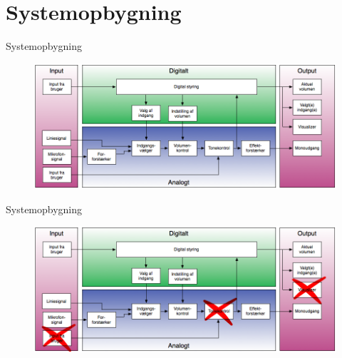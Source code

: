 \section{Systemopbygning}
\begin{frame}{Systemopbygning}

\begin{figure}[h]
\centering
\includegraphics[width=\textwidth]{images/forstaerker_opbygning.png}
\end{figure}

\end{frame}

\begin{frame}{Systemopbygning}

\begin{figure}[h]
\centering
\includegraphics[width=\textwidth]{images/forstaerker_opbygning2.png}
\end{figure}

\end{frame}